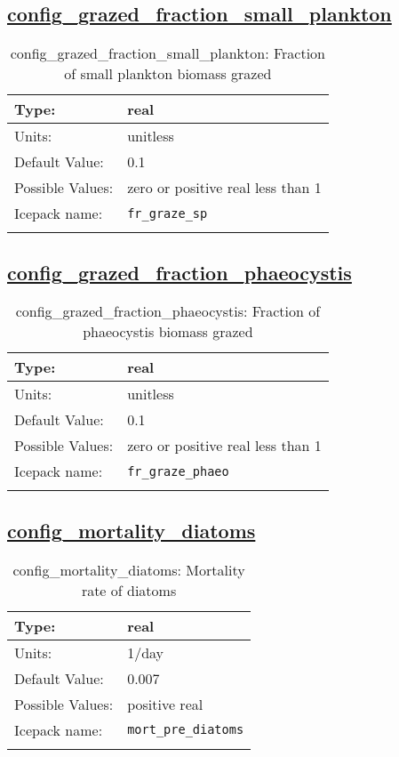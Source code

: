 \subsection[config\_grazed\_fraction\_small\_plankton]{\hyperref[sec:nm_tab_biogeochemistry]{config\_grazed\_fraction\_small\_plankton}}
\label{subsec:nm_sec_config_grazed_fraction_small_plankton}
\begin{center}
\begin{longtable}{| p{2.0in} || p{4.0in} |}
    \hline
    Type: & real \\
    \hline
    Units: & \si{unitless} \\
    \hline
    Default Value: & 0.1 \\
    \hline
    Possible Values: & zero or positive real less than 1 \\
    \hline
    Icepack name: & \verb+fr_graze_sp+ \\
    \hline
    \caption{config\_grazed\_fraction\_small\_plankton: Fraction of small plankton biomass grazed}
\end{longtable}
\end{center}
\subsection[config\_grazed\_fraction\_phaeocystis]{\hyperref[sec:nm_tab_biogeochemistry]{config\_grazed\_fraction\_phaeocystis}}
\label{subsec:nm_sec_config_grazed_fraction_phaeocystis}
\begin{center}
\begin{longtable}{| p{2.0in} || p{4.0in} |}
    \hline
    Type: & real \\
    \hline
    Units: & \si{unitless} \\
    \hline
    Default Value: & 0.1 \\
    \hline
    Possible Values: & zero or positive real less than 1 \\
    \hline
    Icepack name: & \verb+fr_graze_phaeo+ \\
    \hline
    \caption{config\_grazed\_fraction\_phaeocystis: Fraction of phaeocystis biomass grazed}
\end{longtable}
\end{center}
\subsection[config\_mortality\_diatoms]{\hyperref[sec:nm_tab_biogeochemistry]{config\_mortality\_diatoms}}
\label{subsec:nm_sec_config_mortality_diatoms}
\begin{center}
\begin{longtable}{| p{2.0in} || p{4.0in} |}
    \hline
    Type: & real \\
    \hline
    Units: & \si{1/day} \\
    \hline
    Default Value: & 0.007 \\
    \hline
    Possible Values: & positive real \\
    \hline
    Icepack name: & \verb+mort_pre_diatoms+ \\
    \hline
    \caption{config\_mortality\_diatoms: Mortality rate of diatoms}
\end{longtable}
\end{center}
